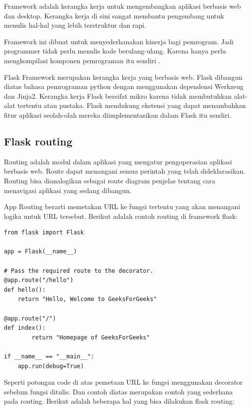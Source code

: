 Framework adalah kerangka kerja untuk mengembangkan aplikasi berbasis web dan desktop. Kerangka kerja di sini sangat membantu pengembang untuk menulis hal-hal yang lebih terstruktur dan rapi.

Framework ini dibuat untuk menyederhanakan kinerja bagi pemrogram. Jadi programmer tidak perlu menulis kode berulang-ulang. Karena hanya perlu mengkompilasi komponen pemrograman itu sendiri \citep{robithadani2020framework}.

Flask Framework merupakan kerangka kerja yang berbasis web. Flask dibangun diatas bahasa pemrograman python dengan menggunakan dependensi Werkzeug dan Jinja2. Kerangka kerja Flask bersifat mikro karena tidak membutuhkan alat-alat tertentu atau pustaka. Flask mendukung ekstensi yang dapat menambahkan fitur aplikasi seolah-olah mereka diimplementasikan dalam Flask itu sendiri.
	
	
	\subsection {Flask routing}
	
	Routing adalah modul dalam aplikasi yang mengatur pengoperasian aplikasi berbasis web. Route dapat menangani semua perintah yang telah  dideklarasikan. Routing bisa dianalogikan sebagai route diagram penjelas tentang cara menavigasi aplikasi yang sedang dibangun.
	
	App Routing berarti memetakan URL ke fungsi tertentu yang akan menangani logika untuk URL tersebut. Berikut adalah contoh routing di framework flask:

\begin{lstlisting}
from flask import Flask
  
app = Flask(__name__)
  
# Pass the required route to the decorator.
@app.route("/hello")
def hello():
   	return "Hello, Welcome to GeeksForGeeks"
    
@app.route("/")
def index():
    	return "Homepage of GeeksForGeeks"
  
if __name__ == "__main__":
	app.run(debug=True)
\end{lstlisting}

Seperti potongan code di atas pemetaan URL ke fungsi menggunakan decorator sebelum fungsi ditulis. Dan contoh diatas merupakan contoh yang sederhana pada routing. Berikut adalah beberapa hal yang bisa dilakukan flask routing:

